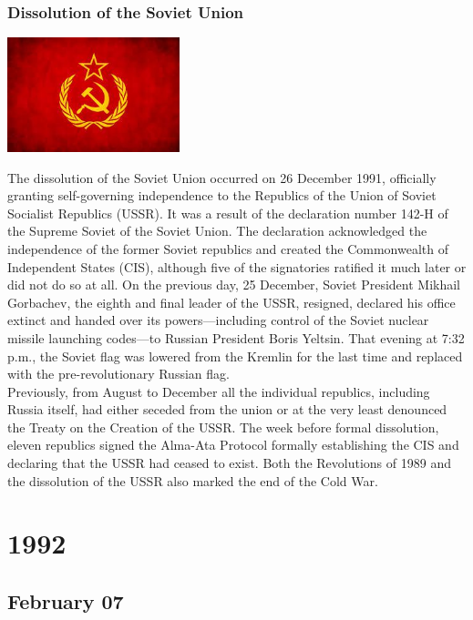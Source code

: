 \documentclass[11pt]{report}
\begin{document}
\subsection{Dissolution of the Soviet Union}
\vspace{2mm}\begin{center}\includegraphics[width=5cm]{./img/ussr.jpg}\end{center}
The dissolution of the Soviet Union occurred on 26 December 1991, officially granting self-governing independence to the Republics of the Union of Soviet Socialist Republics (USSR). It was a result of the declaration number 142-H of the Supreme Soviet of the Soviet Union. The declaration acknowledged the independence of the former Soviet republics and created the Commonwealth of Independent States (CIS), although five of the signatories ratified it much later or did not do so at all. On the previous day, 25 December, Soviet President Mikhail Gorbachev, the eighth and final leader of the USSR, resigned, declared his office extinct and handed over its powers—including control of the Soviet nuclear missile launching codes—to Russian President Boris Yeltsin. That evening at 7:32 p.m., the Soviet flag was lowered from the Kremlin for the last time and replaced with the pre-revolutionary Russian flag.\\
\indent Previously, from August to December all the individual republics, including Russia itself, had either seceded from the union or at the very least denounced the Treaty on the Creation of the USSR. The week before formal dissolution, eleven republics signed the Alma-Ata Protocol formally establishing the CIS and declaring that the USSR had ceased to exist. Both the Revolutions of 1989 and the dissolution of the USSR also marked the end of the Cold War.

\chapter{1992}
\section{February 07}
\end{document}
